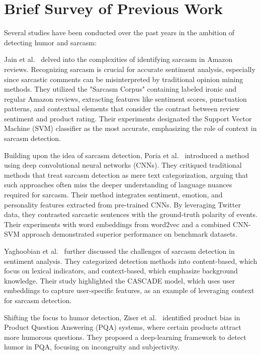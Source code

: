 \documentclass[10pt,twocolumn,letterpaper]{article}
\begin{document}

\section{Brief Survey of Previous Work}

Several studies have been conducted over the past years in the ambition of detecting humor and sarcasm:

Jain et al.~\cite{jain2019} delved into the complexities of identifying sarcasm in Amazon reviews. Recognizing sarcasm is crucial for accurate sentiment analysis, especially since sarcastic comments can be misinterpreted by traditional opinion mining methods. They utilized the "Sarcasm Corpus" containing labeled ironic and regular Amazon reviews, extracting features like sentiment scores, punctuation patterns, and contextual elements that consider the contrast between review sentiment and product rating. Their experiments designated the Support Vector Machine (SVM) classifier as the most accurate, emphasizing the role of context in sarcasm detection.

Building upon the idea of sarcasm detection, Poria et al.~\cite{poria2020} introduced a method using deep convolutional neural networks (CNNs). They critiqued traditional methods that treat sarcasm detection as mere text categorization, arguing that such approaches often miss the deeper understanding of language nuances required for sarcasm. Their method integrates sentiment, emotion, and personality features extracted from pre-trained CNNs. By leveraging Twitter data, they contrasted sarcastic sentences with the ground-truth polarity of events. Their experiments with word embeddings from word2vec and a combined CNN-SVM approach demonstrated superior performance on benchmark datasets.

Yaghoobian et al.~\cite{yaghoobian2020} further discussed the challenges of sarcasm detection in sentiment analysis. They categorized detection methods into content-based, which focus on lexical indicators, and context-based, which emphasize background knowledge. Their study highlighted the CASCADE model, which uses user embeddings to capture user-specific features, as an example of leveraging context for sarcasm detection.

Shifting the focus to humor detection, Ziser et al.~\cite{ziser2020} identified product bias in Product Question Answering (PQA) systems, where certain products attract more humorous questions. They proposed a deep-learning framework to detect humor in PQA, focusing on incongruity and subjectivity.
\end{document}
